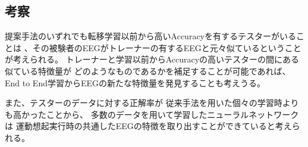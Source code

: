 \subsection{\mc 考察}
提案手法のいずれでも転移学習以前から高いAccuracyを有するテスターがいることは
、その被験者のEEGがトレーナーの有するEEGと元々似ているということが考えられる。
トレーナーと学習以前からAccuracyの高いテスターの間にある似ている特徴量が
どのようなものであるかを補足することが可能であれば、
End to End学習からEEGの新たな特徴量を発見することも考えうる。

また、テスターのデータに対する正解率が
従来手法を用いた個々の学習時よりも高かったことから、
多数のデータを用いて学習したニューラルネットワークは
運動想起実行時の共通したEEGの特徴を取り出すことができていると考えられる。


